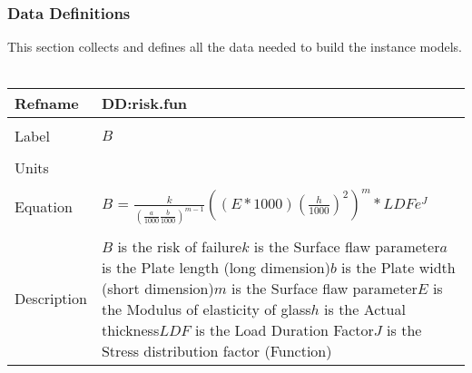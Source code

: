 \documentclass[12pt]{article}
\begin{document}
\subsubsection{Data Definitions}
\label{Sec:DD}
This section collects and defines all the data needed to build the instance models.
~\newline
\noindent \begin{minipage}{\textwidth}
\begin{tabular}{p{} p{}}
\toprule \textbf{Refname} & \textbf{DD:risk.fun}
\label{DD:risk.fun}
\\ \midrule \\
Label & $B$
\\ \midrule \\
Units & 
\\ \midrule \\
Equation & $B$ = $\frac{k}{(\frac{a}{1000}\frac{b}{1000})^{m-1}}((E*1000)(\frac{h}{1000})^{2})^{m}*LDFe^{J}$
\\ \midrule \\
Description & $B$ is the risk of failure\newline$k$ is the Surface flaw parameter\newline$a$ is the Plate length (long dimension)\newline$b$ is the Plate width (short dimension)\newline$m$ is the Surface flaw parameter\newline$E$ is the Modulus of elasticity of glass\newline$h$ is the Actual thickness\newline$LDF$ is the Load Duration Factor\newline$J$ is the Stress distribution factor (Function)
\\ \bottomrule \end{tabular}
\end{minipage}\\
~\newline
\end{document}
